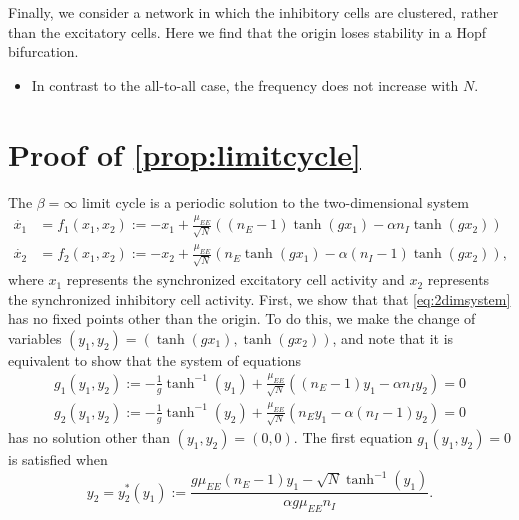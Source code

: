 \documentclass[reqno]{siamonline190516}
\begin{document}
Finally, we consider a network in which the inhibitory cells are clustered, rather than the excitatory cells. Here we find that the origin loses stability in a Hopf bifurcation. 
\begin{itemize}
    \item In contrast to the all-to-all case, the frequency does not increase with $N$.
\end{itemize}

\appendix

\section{Proof of \cref{prop:limitcycle}}\label{sec:limitcycleproof}

The $\beta = \infty$ limit cycle is a periodic solution to the two-dimensional system
\begin{equation}\label{eq:2dimsystem}
\begin{aligned}
\dot{x_1} &= f_1(x_1, x_2) := -x_1 + \frac{\mu_{EE}}{\sqrt{N}}\left((n_E - 1) \tanh(g x_1) - \alpha n_I \tanh(g x_2) \right) \\
\dot{x_2} &= f_2(x_1, x_2) := -x_2 + \frac{\mu_{EE}}{\sqrt{N}}\left( n_E \tanh(g x_1) - \alpha (n_I - 1) \tanh(g x_2) \right), 
\end{aligned}
\end{equation}
where $x_1$ represents the synchronized excitatory cell activity and $x_2$ represents the synchronized inhibitory cell activity. First, we show that that \cref{eq:2dimsystem} has no fixed points other than the origin. To do this, we make the change of variables $(y_1, y_2) = (\tanh(g x_1),\tanh(g x_2))$, and note that it is equivalent to show that the system of equations
\begin{equation}\label{eq:2dimsystemy}
\begin{aligned}
g_1(y_1, y_2) := -\frac{1}{g}\tanh^{-1}(y_1) + \frac{\mu_{EE}}{\sqrt{N}}\left((n_E - 1) y_1 - \alpha n_I y_2 \right) = 0 \\
g_2(y_1, y_2) := -\frac{1}{g}\tanh^{-1}(y_2) + \frac{\mu_{EE}}{\sqrt{N}}\left( n_E y_1 - \alpha (n_I - 1) y_2 \right) = 0
\end{aligned}
\end{equation}
has no solution other than $(y_1, y_2) = (0,0)$. The first equation $g_1(y_1, y_2) = 0$ is satisfied when
\begin{equation}\label{eq:y2sol}
y_2 = y_2^*(y_1) := \frac{ g \mu_{EE} (n_E-1) y_1 - \sqrt{N} \tanh^{-1}(y_1)}{\alpha g \mu_{EE} n_I}.
\end{equation}
\end{document}
